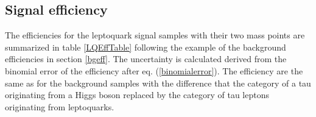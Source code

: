 %
\subsection{Signal efficiency}\label{signaleff}
The efficiencies for the leptoquark signal samples with their two mass points are summarized in table \ref{LQEffTable} following the example of the background efficiencies in section \ref{bgeff}. The uncertainty is calculated derived from the binomial error of the efficiency after eq. (\ref{binomialerror}). The efficiency are the same as for the background samples with the difference that the category of a tau originating from a Higgs boson replaced by the category of tau leptons originating from leptoquarks.\par
%	
